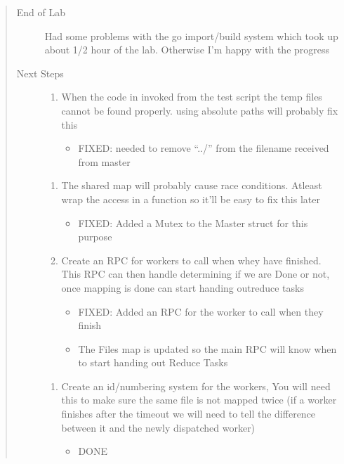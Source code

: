 \documentclass[letterpaper,10pt,english]{sphinxmanual}
\begin{document}
\begin{quote}\begin{description}
\item[{End of Lab}] \leavevmode
Had some problems with the go import/build system which took up about 1/2 hour of the lab.
Otherwise I’m happy with the progress

\item[{Next Steps}] \leavevmode\begin{enumerate}
%
\item {} 
When the code in invoked from the test script the temp files cannot be found properly.
using absolute paths will probably fix this
\begin{itemize}
\item {} 
FIXED: needed to remove “../” from the filename received from master

\end{itemize}

\end{enumerate}
\begin{enumerate}
%
\setcounter{enumi}{2}
\item {} 
The shared map will probably cause race conditions. Atleast wrap the access in
a function so it’ll be easy to fix this later
\begin{itemize}
\item {} 
FIXED: Added a Mutex to the Master struct for this purpose

\end{itemize}

\item {} 
Create an RPC for workers to call when whey have finished.
This RPC can then handle determining if we are Done or not,
once mapping is done  can start handing outreduce tasks
\begin{itemize}
\item {} 
FIXED: Added an RPC for the worker to call when they finish

\item {} 
The Files map is updated so the main RPC will know when
to start handing out Reduce Tasks

\end{itemize}

\end{enumerate}
\begin{enumerate}
%
\setcounter{enumi}{5}
\item {} 
Create an id/numbering system for the workers, You will need this to make sure the same
file is not mapped twice (if a worker finishes after the timeout we will need to tell
the difference between it and the newly dispatched worker)
\begin{itemize}
\item {} 
DONE


\end{itemize}
\end{enumerate}
\end{description}
\end{quote}
\end{document}
